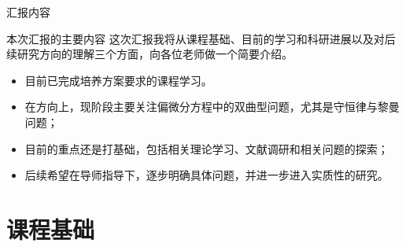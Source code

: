 \documentclass{beamer}
\begin{document}
\begin{frame}{汇报内容}
\begin{block}{本次汇报的主要内容}
这次汇报我将从课程基础、目前的学习和科研进展以及对后续研究方向的理解三个方面，向各位老师做一个简要介绍。
\end{block}

\begin{itemize}
    \item 目前已完成培养方案要求的课程学习。
    \item 在方向上，现阶段主要关注偏微分方程中的双曲型问题，尤其是守恒律与黎曼问题；
    \item 目前的重点还是打基础，包括相关理论学习、文献调研和相关问题的探索；
    \item 后续希望在导师指导下，逐步明确具体问题，并进一步进入实质性的研究。
\end{itemize}
\end{frame}
























\section{课程基础}
\end{document}
